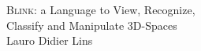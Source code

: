 \documentclass[a4,12pt]{article}
\begin{document}
\thispagestyle{empty}

\begin{center} \large
\textsc{Blink}: a Language to View, Recognize, \\ Classify and Manipulate 3D-Spaces\\[1.5cm]
\normalsize Lauro Didier Lins
\end{center}

\vspace{2cm}


\end{document}
